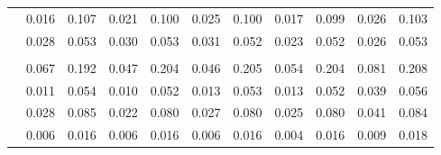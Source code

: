 \begin{table}[t]
\begin{tabular}{lcccccccccc}
\RedFail{} & 0.016 & 0.107 & 0.021 & 0.100 & 0.025 & 0.100 & 0.017 & 0.099 & 0.026 & 0.103 \\
\Regressions{} & 0.028 & 0.053 & 0.030 & 0.053 & 0.031 & 0.052 & 0.023 & 0.052 & 0.026 & 0.053 \\
\addlinespace[3pt]
\multicolumn{11}{l}{\quad\textit{Qwen3.6-35B-A3B}} \\
\Syntactic{} & 0.067 & 0.192 & 0.047 & 0.204 & 0.046 & 0.205 & 0.054 & 0.204 & 0.081 & 0.208 \\
\Semantic{} & 0.011 & 0.054 & 0.010 & 0.052 & 0.013 & 0.053 & 0.013 & 0.052 & 0.039 & 0.056 \\
\RedFail{} & 0.028 & 0.085 & 0.022 & 0.080 & 0.027 & 0.080 & 0.025 & 0.080 & 0.041 & 0.084 \\
\Regressions{} & 0.006 & 0.016 & 0.006 & 0.016 & 0.006 & 0.016 & 0.004 & 0.016 & 0.009 & 0.018 \\
\bottomrule
\end{tabular}
\end{table}